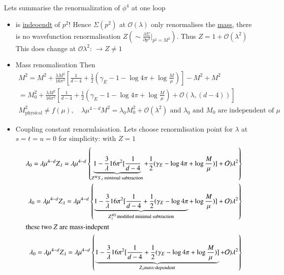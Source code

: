 Lets summarise the renormalization of $\phi^4$ at one loop
\begin{itemize}
	\item   %
		is \underline{indeoendt} of $p^2$! Hence $\Sigma(p^2)$ at $\mathcal{O}(\lambda)$ only renormalises the \underline{mass}, there is no wavefunction renormalisation $Z (\sim \frac{\partial \Sigma}{\partial p^3} |_{p^2 = M^2})$. Thus $Z=1 + \mathcal{O}(\lambda^2)$
	This does change at $\mathcal{O}{\lambda^2}$: %
	$\rightarrow Z\neq 1$
\item Mass renomalisation
	Then 
	\begin{align*}
	M^2 = M^2 + \frac{\lambda M^2}{16\pi^2} \left[ \frac{1}{d-4} + \frac{1}{2} (\gamma_E - 1 -\log{4\pi} + \log{\frac{M}{\mu}}) \right]- M^2 + M^2 \\
	= M^2_0 + \frac{\lambda M^2}{16\pi^2} \left[ \frac{1}{d-4}  + \frac{1}{2}(\gamma_E - 1 - \log{4\pi} + \log{\frac{M}{\mu}}) + \mathcal{O}(\lambda, (d-4)) \right] \\
	M^2_\text{physical} \neq f(\mu), \quad \lambda \mu^{4-d} M^2 = \lambda_0 M_0^2 + \mathcal{O}(\lambda^2) \text{ and $\lambda_0$ and $M_0$ are independent of $\mu$}
	\end{align*}
	\item Coupling constant renormlaisation. Lets choose renormlisation point for $\lambda$ at $s=t=u=0$ for simplicity:
		with $Z=1$
		\begin{align*}
			\lambda_0 =  \lambda \mu^{4-d}Z_\lambda = \lambda \mu^{4-d} \left\{ \underbrace{1- \frac{3}{\lambda}{16\pi^2} [ \frac{1}{d-4}}_{Z^MS_\lambda \text{ minimal subtraction}} +\frac{1}{2} (\gamma_E -\log{4\pi} + \log{\frac{M}{\mu}})] + \mathcal{O})\lambda^2 \right\} \\
			\lambda_0 =  \lambda \mu^{4-d}Z_\lambda = \lambda \mu^{4-d} \left\{ \underbrace{1- \frac{3}{\lambda}{16\pi^2} [ \frac{1}{d-4} +\frac{1}{2} (\gamma_E -\log{4\pi} }_{Z^{\bar{MS}}_\lambda \text{modified minimal subtraction}} + \log{\frac{M}{\mu}})] + \mathcal{O})\lambda^2 \right\} \\
			\shortintertext{\text{these two $Z$ are mass-indepent}}
			\lambda_0 =  \lambda \mu^{4-d}Z_\lambda = \lambda \mu^{4-d} \left\{ \underbrace{1- \frac{3}{\lambda}{16\pi^2} [ \frac{1}{d-4} +\frac{1}{2} (\gamma_E -\log{4\pi}  + \log{\frac{M}{\mu}})] }_{Z_\lambda \text{mass-dependent}}+ \mathcal{O})\lambda^2 \right\} 
		\end{align*}
\end{itemize}

